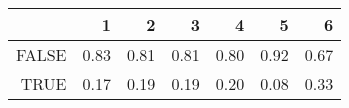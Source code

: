 \begin{table}[ht]
\centering
\begin{tabular}{rrrrrrr}
  \hline
 & 1 & 2 & 3 & 4 & 5 & 6 \\ 
  \hline
FALSE & 0.83 & 0.81 & 0.81 & 0.80 & 0.92 & 0.67 \\ 
  TRUE & 0.17 & 0.19 & 0.19 & 0.20 & 0.08 & 0.33 \\ 
   \hline
\end{tabular}
\end{table}
